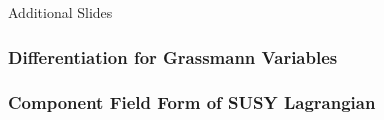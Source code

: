 \documentclass[10pt,aspectratio=169]{beamer}
\begin{document}
\appendix

\begin{frame}
  \begin{center}
    {
      \Large
      Additional Slides
    }
  \end{center}
\end{frame}


\begin{frame}
  \frametitle{Differentiation for Grassmann Variables}
\end{frame}

\begin{frame}
  \frametitle{Component Field Form of SUSY Lagrangian}
\end{frame}
\end{document}
